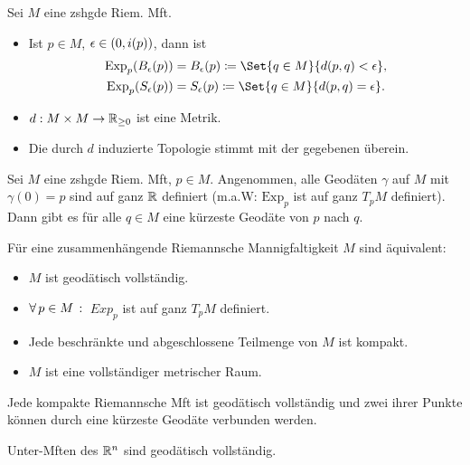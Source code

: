 \documentclass{cheat-sheet}
\newcommand{\Exp}{\mathrm{Exp}} %
\begin{document}
\begin{satz}
  Sei $M$ eine zshgde Riem. Mft.
  \begin{itemize}
    \item Ist $p \in M$, $\epsilon \in \left( 0, i(p) \right)$, dann ist
    \begin{align*}
      \Exp_p(B_\epsilon(p)) & = B_\epsilon(p) \coloneqq \Set{q \in M}{d(p, q) < \epsilon},\\
      \Exp_p(S_\epsilon(p)) & = S_\epsilon(p) \coloneqq \Set{q \in M}{d(p, q) = \epsilon}.
    \end{align*}
    \item $d : M \times M \to \mathbb{R}_{\geq 0}$ ist eine Metrik.
    \item Die durch $d$ induzierte Topologie stimmt mit der gegebenen überein.
  \end{itemize}
\end{satz}


\begin{satz}
  Sei $M$ eine zshgde Riem. Mft, $p \in M$. Angenommen, alle Geodäten $\gamma$ auf $M$ mit $\gamma(0) = p$ sind auf ganz $\mathbb{R}$ definiert (m.a.W: $\Exp_p$ ist auf ganz $T_p M$ definiert). Dann gibt es für alle $q \in M$ eine kürzeste Geodäte von $p$ nach $q$.
\end{satz}

\begin{satz}
  Für eine zusammenhängende Riemannsche Mannigfaltigkeit $M$ sind äquivalent:
  \begin{itemize}
    \item $M$ ist geodätisch vollständig.
    \item $\forall \, {p \in M} \,:\,$ $Exp_p$ ist auf ganz $T_p M$ definiert.
    \item Jede beschränkte und abgeschlossene Teilmenge von $M$ ist kompakt.
    \item $M$ ist eine vollständiger metrischer Raum.
  \end{itemize}
\end{satz}

\begin{kor}
  Jede kompakte Riemannsche Mft ist geodätisch vollständig und zwei ihrer Punkte können durch eine kürzeste Geodäte verbunden werden.
\end{kor}

\begin{kor}
  Unter-Mften des $\mathbb{R}^n$ sind geodätisch vollständig.
\end{kor}
\end{document}
